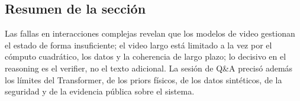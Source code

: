\subsection{Resumen de la sección}

Las fallas en interacciones complejas revelan que los modelos de video gestionan el estado de forma insuficiente; el video largo está limitado a la vez por el cómputo cuadrático, los datos y la coherencia de largo plazo; lo decisivo en el reasoning es el verifier, no el texto adicional. La sesión de Q\&A precisó además los límites del Transformer, de los priors físicos, de los datos sintéticos, de la seguridad y de la evidencia pública sobre el sistema.
